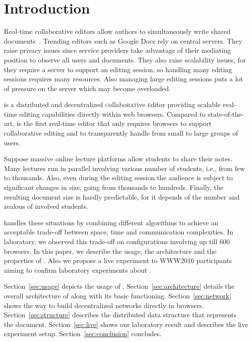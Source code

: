 
\section{Introduction}
\label{sec:introduction}

Real-time collaborative editors allow authors to simultaneously write shared
documents~\cite{greenberg1994real}. Trending editors such as Google Docs rely on
central servers. They raise privacy issues since service providers take
advantage of their mediating position to observe all users and documents. They
also raise scalability issues, for they require a server to support an editing
session, so handling many editing sessions requires many resources. Also
managing large editing sessions puts a lot of pressure on the server which may
become overloaded.


\CRATE is a distributed and decentralized \textsc{c}ollabo\textsc{rat}ive
\textsc{e}ditor providing scalable real-time editing capabilities directly
within web browsers. Compared to state-of-the-art, \CRATE is the first real-time
editor that only requires browsers to support collaborative editing and to
transparently handle from small to large groups of users.

Suppose massive online lecture platforms allow students to share their
notes. Many lectures run in parallel involving various number of students, i.e.,
from few to thousands. Also, even during the editing session the audience is subject
to significant changes in size, going from thousands to hundreds. Finally, the
resulting document size is hardly predictable, for it depends of the number and
zealous of involved students.

\CRATE handles these situations by combining different algorithms to achieve an
acceptable trade-off between space, time and communication complexities. In
laboratory, we observed this trade-off on configurations involving up till 600
browsers. In this paper, we describe the usage, the architecture and the
properties of \CRATE. Also we propose a live experiment to WWW2016 participants
aiming to confirm laboratory experiments about \CRATE.

Section~\ref{sec:usage} depicts the usage of \CRATE.
Section~\ref{sec:architecture} details the overall architecture of \CRATE along
with its basic functioning. Section~\ref{sec:network} shows the way to build
decentralized networks directly in browsers.  Section~\ref{sec:structure}
describes the distributed data structure that represents the document.
Section~\ref{sec:live} shows our laboratory result and describes the live
experiment setup. Section~\ref{sec:conclusion} concludes.


